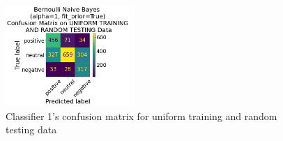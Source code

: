 \documentclass[11pt]{article}
\begin{document}
\begin{figure}[!h]
	\centering
	\includegraphics[width = 0.42\textwidth]{cf/BernoulliNaiveBayesalpha1fit_priorTrue-UniformTrainingandRandomTesting-confusion-matrix.png}
	\caption{Classifier 1's confusion matrix for uniform training and random testing data}
	\label{fig:cf-1st-ur}
\end{figure} 
\end{document}
